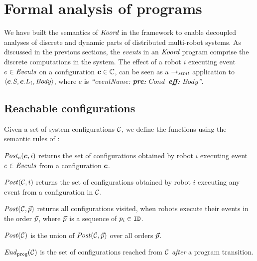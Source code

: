 
\section{Formal analysis of \lgname programs}
\label{sec:verification}

\newcommand{\Ev}{\ensuremath{e}\xspace}
\newcommand{\EvCond}{\ensuremath{\mathit{Cond}}\xspace}
\newcommand{\EvBody}{\ensuremath{\mathit{Body}}\xspace}


We have built the semantics of $\emph{Koord}$ in the \K framework to enable decoupled analyses of discrete and dynamic parts of distributed multi-robot systems.
As discussed in the previous sections, the \emph{events} in an $\emph{Koord}$ program comprise the discrete computations in the system.
The effect of a robot $i$ executing event $\Ev \in \Event$ on a configuration $\mathit{\boldsymbol{c}} \in \mathbb{C}$,
can be seen as a $\rightarrow_\mathit{stmt}$ application to  $\left\langle \gconfig.S, \gconfig.\lconfig{i}, \EvBody \right\rangle $,
where $\Ev$ is \emph{``eventName: {\normalfont\bf pre:} \EvCond\ {\normalfont\bf eff:} \EvBody''}.


\subsection{Reachable configurations}

Given a set of system configurations $\mathcal{C}$,
we define the functions using the semantic rules of :
\begin{inparaenum}[(i)]
    \item $\Post_\Ev(\gconfig,i)$ returns the set of configurations obtained by robot $i$ executing event $\Ev \in \Event$ from a configuration $\mathit{\boldsymbol{c}}$.
    \item $\mathit{Post}(\mathcal{C},i)$ returns the set of configurations obtained by robot $i$ executing any event from a configuration in $\mathcal{C}$.
    \item $\mathit{Post}(\mathcal{C},\vec{p})$ returns all configurations visited, when robots execute their events in the order $\vec{p}$,
          where $\vec{p}$ is a sequence of $p_i \in \texttt{ID}$.
    \item $\mathit{Post}(\mathcal{C})$ is the union of $\mathit{Post}(\mathcal{C},\vec{p})$ over all orders $\vec{p}$.
    \item $\mathit{End}_{\mathtt{prog}}(\mathcal{C})$ is the set of configurations reached from $\mathcal{C}$ \emph{after} a program transition.
\end{inparaenum}

